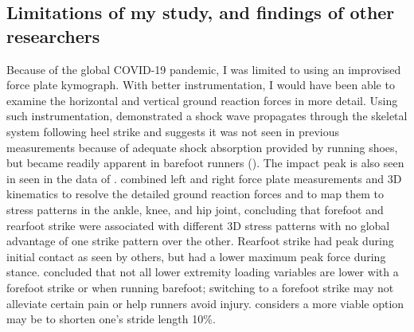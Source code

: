 \subsection{Limitations of my study, and findings of other researchers}
Because of the global COVID-19 pandemic, I was limited to using an improvised force plate kymograph.  With better instrumentation, I would have been able to examine the horizontal and vertical ground reaction forces in more detail. Using such instrumentation, \citet{dickinson1985measurement} demonstrated a shock wave propagates through the skeletal system following heel strike and suggests it was not seen in previous measurements because of adequate shock absorption provided by running shoes, but became readily apparent in barefoot runners (). The impact peak is also seen in seen in the data of \citep{chan1994foot, boyer2015rearfoot, lieberman2010foot}. \citet{knorz2017three} combined left and right force plate measurements and 3D kinematics to resolve the detailed ground reaction forces and to map them to stress patterns in the ankle, knee, and hip joint, concluding that forefoot and rearfoot strike were associated with different 3D stress patterns with no global advantage of one strike pattern over the other. Rearfoot strike had peak during initial contact as seen by others, but had a lower maximum peak force during stance. \citet{boyer2015rearfoot} concluded that not all lower extremity loading variables are lower with a forefoot strike or when running barefoot; switching to a forefoot strike may not alleviate certain pain or help runners avoid injury. \citet{boyer2015rearfoot} considers a more viable option may be to shorten one’s stride length 10\%.

